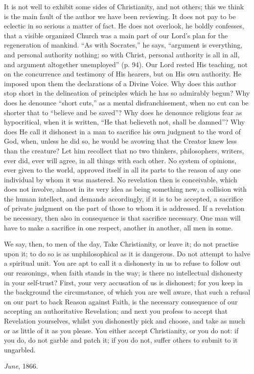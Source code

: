 It is not well to exhibit some sides of
Christianity, and not others; this we think is the main fault of the
author we have been reviewing. It does not pay to be eclectic in
so serious a matter of fact. He does not overlook, he boldly
confesses, that a visible organized Church was a main part of our Lord's
plan for the regeneration of mankind. ``As with Socrates,'' he says, ``argument
is everything, and personal authority nothing; so with Christ,
personal authority is all in all, and argument altogether unemployed''
(p. 94). Our Lord rested His teaching, not on the concurrence and
testimony of His hearers, but on His own authority. He imposed upon
them the declarations of a Divine Voice. Why does this author stop
short in the delineation of principles which he has so admirably
begun? Why does he denounce ``short cuts,'' as a mental
disfranchisement, when no cut can be shorter that to ``believe and be
saved''? Why does he denounce religious fear as hypocritical, when it
is written, ``He that believeth not, shall be damned''? Why does He call
it dishonest in a man to sacrifice his own judgment to the word of
God, when, unless he did so, he would be avowing that the Creator knew
less than the creature? Let him recollect that no two thinkers,
philosophers, writers, ever did, ever will agree, in all things with
each other. No system of opinions, ever given to the world, approved
itself in all its parts to the reason of any one individual by whom it
was mastered. No revelation then is conceivable, which does not
involve, almost in its very idea as being something new, a collision
with the human intellect, and demands accordingly, if it is to be
accepted, a sacrifice of private judgment on the part of those to whom
it is addressed. If a revelation be necessary, then also in
consequence is that sacrifice necessary. One man will have to make a
sacrifice in one respect, another in another, all men in some.

We say, then, to men of the day, Take
Christianity, or leave it; do not practise upon it; to do so is as
unphilosophical as it is dangerous. Do not attempt to halve a
spiritual unit. You are apt to call it a dishonesty in us to refuse to
follow out our reasonings, when faith stands in the way; is there no
intellectual dishonesty in your self-trust? First, your very
accusation of us is dishonest; for you keep in the background the
circumstance, of which you are well aware, that such a refusal on our
part to back Reason against Faith, is the necessary consequence of our
accepting an authoritative Revelation; and next you profess to accept
that Revelation yourselves, whilst you dishonestly pick and choose,
and take as much or as little of it as you please. You either accept
Christianity, or you do not: if you do, do not garble and patch it; if
you do not, suffer others to submit to it ungarbled.

\emph{June}, 1866.
